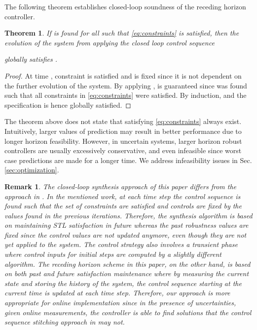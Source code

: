 \documentclass[letterpaper, 10 pt, conference]{ieeeconf}
\newtheorem{remark}{Remark}
\newtheorem{theorem}{Theorem}
\begin{document}
The following theorem establishes closed-loop soundness of the receding horizon controller. 
\begin{theorem}
If  is found for all  such that \eqref{eq:constraints} is satisfied, then the evolution of the system from applying the closed loop control sequence

globally satisfies . 
\end{theorem}
\begin{proof}
At time , constraint  is satisfied and  is fixed since it is not dependent on the further evolution of the system. 
By applying ,  is guaranteed since  was found such that all constraints in  \eqref{eq:constraints} were satisfied. By induction,   and the specification  is hence globally satisfied.
\end{proof}
The theorem above does not state that  satisfying \eqref{eq:constraints} always exist. Intuitively, larger values of prediction  may result in better performance due to longer horizon feasibility. However, in uncertain systems, larger horizon robust controllers are usually excessively conservative, and even infeasible since worst case predictions are made for a longer time. We address infeasibility issues in Sec. \ref{sec:optimization}.

\begin{remark}
The closed-loop synthesis approach of this paper differs from the approach in \cite{raman2015reactive}. In the mentioned work, at each time step the control sequence  is found such that the set of constraints  are satisfied and controls  are fixed by the values found in the previous iterations. Therefore, the synthesis algorithm is based on maintaining STL satisfaction in future whereas the past robustness values are fixed since the control values  are not updated anymore, even though they are not yet applied to the system. The control strategy also involves a transient phase where control inputs for initial steps are computed by a slightly different algorithm.
The receding horizon scheme in this paper, on the other hand, is based on both past and future satisfaction maintenance where by measuring the current state and storing the history of the system, the control sequence starting at the current time is updated at each time step. Therefore, our approach is more appropriate for online implementation since in the presence of uncertainties, given online measurements, the controller is able to find solutions that the control sequence stitching approach in \cite{raman2015reactive} may not. 
\end{remark}
\end{document}
